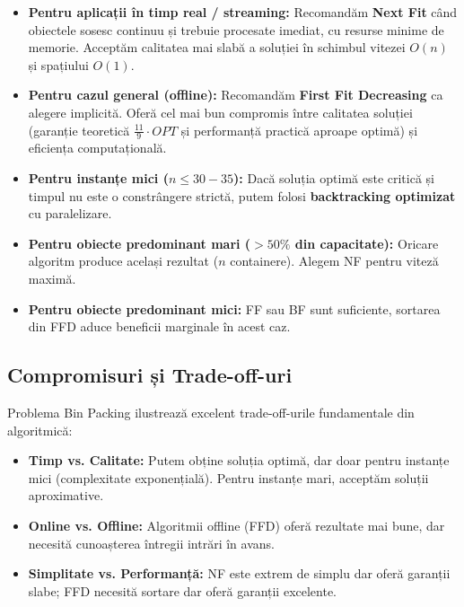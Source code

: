 \documentclass[runningheads]{llncs}
\begin{document}
\begin{itemize}
    \item \textbf{Pentru aplicații în timp real / streaming:} Recomandăm \textbf{Next Fit} când obiectele sosesc continuu și trebuie procesate imediat, cu resurse minime de memorie. Acceptăm calitatea mai slabă a soluției în schimbul vitezei $O(n)$ și spațiului $O(1)$.
    
    \item \textbf{Pentru cazul general (offline):} Recomandăm \textbf{First Fit Decreasing} ca alegere implicită. Oferă cel mai bun compromis între calitatea soluției (garanție teoretică $\frac{11}{9} \cdot OPT$ și performanță practică aproape optimă) și eficiența computațională.
    
    \item \textbf{Pentru instanțe mici ($n \leq 30-35$):} Dacă soluția optimă este critică și timpul nu este o constrângere strictă, putem folosi \textbf{backtracking optimizat} cu paralelizare.
    
    \item \textbf{Pentru obiecte predominant mari ($>50\%$ din capacitate):} Oricare algoritm produce același rezultat ($n$ containere). Alegem NF pentru viteză maximă.
    
    \item \textbf{Pentru obiecte predominant mici:} FF sau BF sunt suficiente, sortarea din FFD aduce beneficii marginale în acest caz.
\end{itemize}

\subsection{Compromisuri și Trade-off-uri}

Problema Bin Packing ilustrează excelent trade-off-urile fundamentale din algoritmică:
\begin{itemize}
    \item \textbf{Timp vs. Calitate:} Putem obține soluția optimă, dar doar pentru instanțe mici (complexitate exponențială). Pentru instanțe mari, acceptăm soluții aproximative.
    \item \textbf{Online vs. Offline:} Algoritmii offline (FFD) oferă rezultate mai bune, dar necesită cunoașterea întregii intrări în avans.
    \item \textbf{Simplitate vs. Performanță:} NF este extrem de simplu dar oferă garanții slabe; FFD necesită sortare dar oferă garanții excelente.
\end{itemize}
\end{document}
